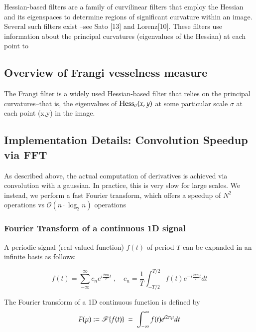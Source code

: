         Hessian-based filters are a family of curvilinear filters that employ the Hessian and its eigenspaces
        to determine regions of significant curvature within an image.
        Several such filters exist --see Sato [13] and Lorenz[10]. These filters use information about the principal curvatures (eigenvalues of the Hessian) at each point to 
    \subsection{Overview of Frangi vesselness measure}
    
        The Frangi filter is a widely used  Hessian-based filter that relies on the principal curvatures--that is,
        the eigenvalues of $\mathrm{Hess}_\sigma(x,y)$ at some particular scale $\sigma$ at each point (x,y) in the image. 
	\subsection{Implementation Details: Convolution Speedup via FFT}
	
	As described above, the actual computation of derivatives is achieved via convolution with a gaussian. In practice, this is very slow for large scales. We instead, we perform a fast Fourier transform, which offers a speedup of $N^2$ operations vs $\mathscr{O}\left(n\cdot \log_2n\right)$ operations 
	
	\subsubsection{Fourier Transform of a continuous 1D signal}
	
	
	A periodic signal (real valued function) $f(t)$ of period $T$ can  be expanded in an infinite basis as follows:
	
	\begin{equation}
		f(t) = \sum_{-\infty}^{\infty} c_n e^{i\frac{2\pi n}{T}t} \;,\quad
			c_n = \frac{1}{T}\int_{-T/2}^{T/2} f(t) e^{-i\frac{2\pi n}{T}t} dt
			\end{equation}
	
	The Fourier transform of a 1D continuous function is defined by
	\begin{equation} \label{1D-CFT}
		F(\mu) := \operatorname{\mathscr{F}}\{f(t)\} \;=\; \int_{-\infty}^{\infty} f(t) e^{i2\pi \mu } dt
	\end{equation}
	
